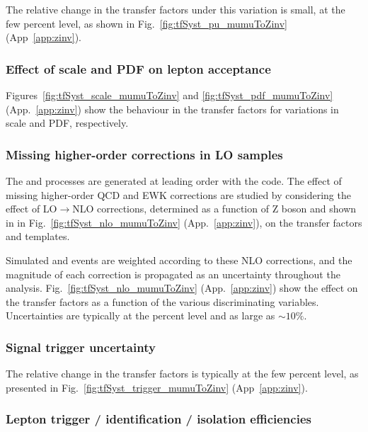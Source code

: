 The relative change in the transfer factors under this variation is
small, at the few percent level, as shown in
Fig.~\ref{fig:tfSyst_pu_mumuToZinv} (App~\ref{app:zinv}).

\subsubsection{Effect of scale and PDF on lepton acceptance}
\label{sec:tfSyst_pdf-zinv}

Figures~\ref{fig:tfSyst_scale_mumuToZinv} and
\ref{fig:tfSyst_pdf_mumuToZinv} (App.~\ref{app:zinv}) show the behaviour
in the transfer factors for variations in scale and PDF, respectively.

\subsubsection{Missing higher-order corrections in LO \texorpdfstring{\MADGRAPH}{MadGraph}
  samples}
\label{sec:nlo-zinv}

The \zmmj and \znunuj processes are generated at leading order with
the \MADGRAPH code. The effect of missing higher-order QCD and EWK
corrections are studied by considering the effect of
LO$\rightarrow$NLO corrections, determined as a function of Z boson
\Pt and shown in in Fig.~\ref{fig:tfSyst_nlo_mumuToZinv}
(App.~\ref{app:zinv}), on the transfer factors and \HTmiss templates.

Simulated \zmmj and \znunuj events are weighted according to these NLO
corrections, and the magnitude of each correction is propagated as an
uncertainty throughout the analysis. Fig.~\ref{fig:tfSyst_nlo_mumuToZinv}
(App.~\ref{app:zinv}) show the effect on the transfer factors as a
function of the various discriminating variables. Uncertainties are
typically at the percent level and as large as $\sim 10\%$.

\subsubsection{Signal trigger uncertainty}
\label{sec:tfSyst_trigger-zinv}

The relative change in the transfer factors is typically at the few
percent level, as presented in Fig.~\ref{fig:tfSyst_trigger_mumuToZinv}
(App~\ref{app:zinv}).

\subsubsection{Lepton trigger / identification / isolation efficiencies}
\label{sec:leptonSyst-zinv}

